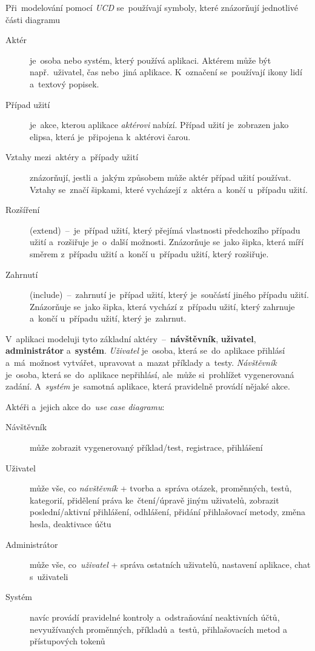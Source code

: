 \documentclass[11pt,a4paper]{report}
\begin{document}
                Při~modelování pomocí \emph{UCD} se~používají symboly, které znázorňují jednotlivé části diagramu
                \begin{description}
                    \item[Aktér] je~osoba nebo systém, který používá aplikaci. Aktérem může být např.~uživatel, čas nebo~jiná aplikace. K~označení se~používají ikony lidí a~textový popisek.
                    \item[Případ užití] je~akce, kterou aplikace \emph{aktérovi} nabízí. Případ užití je~zobrazen jako elipsa, která je~připojena k~aktérovi čarou.
                    \item[Vztahy mezi~aktéry a~případy užití] znázorňují, jestli a~jakým způsobem může aktér případ užití používat. Vztahy se~značí šipkami, které vycházejí z~aktéra a~končí u~případu užití.
                    \item[Rozšíření] (extend)~--~je~případ užití, který přejímá vlastnosti předchozího případu užití a~rozšiřuje je~o~další možnosti. Znázorňuje se~jako šipka, která míří směrem z~případu užití a~končí u~případu užití, který rozšiřuje.
                    \item[Zahrnutí] (include)~--~zahrnutí je~případ užití, který je~součástí jiného případu užití. Znázorňuje se~jako šipka, která vychází z~případu užití, který zahrnuje a~končí u~případu užití, který je~zahrnut.
                \end{description}

                V~aplikaci modeluji tyto základní aktéry~--~\textbf{návštěvník}, \textbf{uživatel}, \textbf{administrátor} a~\textbf{systém}. \emph{Uživatel} je~osoba, která se~do~aplikace přihlásí a~má~možnost vytvářet, upravovat a~mazat příklady a~testy. \emph{Návštěvník} je~osoba, která se~do~aplikace nepřihlásí, ale~může si~prohlížet vygenerovaná zadání. A~\emph{systém} je~samotná aplikace, která pravidelně provádí nějaké akce.

                Aktéři a~jejich akce do~\emph{use case diagramu}:

                \begin{description}
                    \item[Návštěvník] může zobrazit vygenerovaný příklad/test, registrace, přihlášení
                    \item[Uživatel] může vše, co \emph{návštěvník} + tvorba a~správa otázek, proměnných, testů, kategorií, přidělení práva ke~čtení/úpravě jiným uživatelů, zobrazit poslední/aktivní přihlášení, odhlášení, přidání přihlašovací metody, změna hesla, deaktivace účtu
                    \item[Administrátor] může vše, co~\emph{uživatel} + správa ostatních uživatelů, nastavení aplikace, chat s~uživateli
                    \item[Systém] navíc provádí pravidelné kontroly a~odstraňování neaktivních účtů, nevyužívaných proměnných, příkladů a~testů, přihlašovacích metod a přístupových tokenů
                \end{description}
\end{document}
